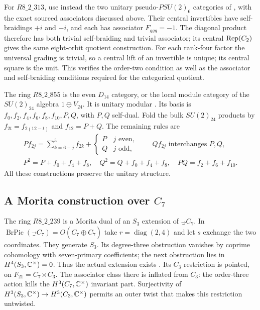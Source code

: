 For $R8\_2\_313$, use instead the two unitary pseudo-$PSU(2)_6$
categories of \cite{EIP}, with the exact sourced associators discussed
above. Their central invertibles have self-braidings $+i$ and $-i$,
and each has associator $F_{ggg}=-1$. The diagonal product therefore
has both trivial self-braiding and trivial associator; its central
$\operatorname{Rep}(C_2)$ gives the same eight-orbit quotient construction.
For each rank-four factor the universal grading is trivial, so a
central lift of an invertible is unique; its central square is the unit.
This verifies the order-two condition as well as the associator and
self-braiding conditions required for the categorical quotient.

The ring $R8\_2\_855$ is the even $D_{14}$ category, or the local
module category of the $SU(2)_{24}$ algebra $1\oplus V_{24}$.
It is unitary modular \cite{MPSskein,MPSknots}. Its basis is
$f_0,f_2,f_4,f_6,f_8,f_{10},P,Q$, with $P,Q$ self-dual. Fold the bulk
$SU(2)_{24}$ products by $f_{2t}=f_{2(12-t)}$ and $f_{12}=P+Q$.
The remaining rules are
\[
\begin{gathered}
P f_{2j}=\sum_{k=6-j}^{5}f_{2k}
 +\begin{cases}P&j\text{ even},\\Q&j\text{ odd},\end{cases}
\qquad Q f_{2j}\text{ interchanges }P,Q,\\
P^2=P+f_0+f_4+f_8,\quad Q^2=Q+f_0+f_4+f_8,
\quad PQ=f_2+f_6+f_{10}.
\end{gathered}
\]
All these constructions preserve the unitary structure.

\subsection{A Morita construction over \texorpdfstring{$C_7$}{C7}}
The ring $R8\_2\_239$ is a Morita dual of an $S_3$ extension of
$\Vec_{C_7}$. In
$\operatorname{BrPic}(\Vec_{C_7})=O(C_7\oplus\widehat{C_7})$ take
$r=\operatorname{diag}(2,4)$ and let $s$ exchange the two coordinates.
They generate $S_3$. Its degree-three obstruction vanishes by coprime
cohomology with seven-primary coefficients; the next obstruction lies
in $H^4(S_3,\mathbb C^\times)=0$. Thus the actual extension exists
\cite[Theorem~1.3]{ENOExt}. Its $C_3$ restriction is pointed, on
$F_{21}=C_7\rtimes C_3$. The associator class there is inflated from
$C_3$: the order-three action kills the $H^3(C_7,\mathbb C^\times)$ invariant
part. Surjectivity of
$H^3(S_3,\mathbb C^\times)\to H^3(C_3,\mathbb C^\times)$ permits an outer twist
that makes this restriction untwisted.

